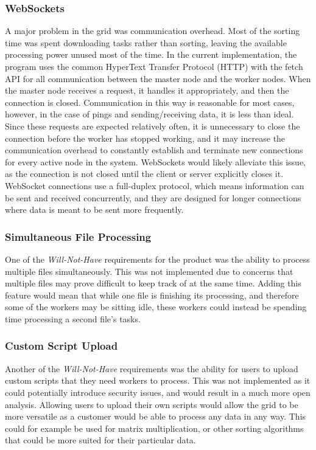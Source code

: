 \subsubsection{WebSockets}
A major problem in the grid was communication overhead. Most of the sorting time was spent downloading tasks rather than sorting, leaving the available processing power unused most of the time. 
In the current implementation, the program uses the common HyperText Transfer Protocol (HTTP) with the fetch API for all communication between the master node and the worker nodes. When the master node receives a request, it handles it appropriately, and then the connection is closed. Communication in this way is reasonable for most cases, however, in the case of pings and sending/receiving data, it is less than ideal.
Since these requests are expected relatively often, it is unnecessary to close the connection before the worker has stopped working, and it may increase the communication overhead to constantly establish and terminate new connections for every active node in the system.
WebSockets would likely alleviate this issue, as the connection is not closed until the client or server explicitly closes it. WebSocket connections use a full-duplex protocol, which means information can be sent and received concurrently, and they are designed for longer connections where data is meant to be sent more frequently.

\subsubsection{Simultaneous File Processing}
One of the \emph{Will-Not-Have} requirements for the product was the ability to process multiple files simultaneously. This was not implemented due to concerns that multiple files may prove difficult to keep track of at the same time. Adding this feature would mean that while one file is finishing its processing, and therefore some of the workers may be sitting idle, these workers could instead be spending time processing a second file's tasks.

\subsubsection{Custom Script Upload}
Another of the \emph{Will-Not-Have} requirements was the ability for users to upload custom scripts that they need workers to process. This was not implemented as it could potentially introduce security issues, and would result in a much more open analysis. Allowing users to upload their own scripts would allow the grid to be more versatile as a customer would be able to process any data in any way. This could for example be used for matrix multiplication, or other sorting algorithms that could be more suited for their particular data.